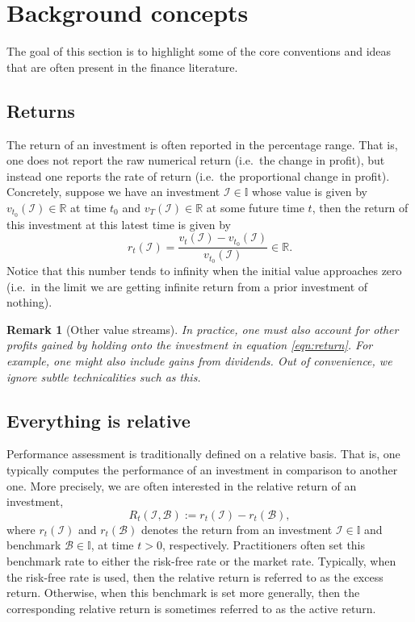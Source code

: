 \documentclass[12pt]{article}
\newtheorem{remark}{Remark}[section]
\begin{document}
\section{Background concepts}
The goal of this section is to highlight some of the core conventions and ideas that are often present in the finance literature.
\subsection{Returns}
The return of an investment is often reported in the percentage range. That is, one does not report the raw numerical return (i.e.\ the change in profit), but instead one reports the rate of return (i.e.\ the proportional change in profit). Concretely, suppose we have an investment $\mathcal{I} \in \mathbb{I}$ whose value is given by $v_{t_0}(\mathcal{I}) \in \mathbb{R}$ at time $t_0$ and $v_T(\mathcal{I}) \in \mathbb{R}$ at some future time $t$, then the return of this investment at this latest time is given by
\begin{equation}
    r_t(\mathcal{I}) = \frac{v_t(\mathcal{I}) - v_{t_0}(\mathcal{I})}{v_{t_0}(\mathcal{I})} \in \mathbb{R}.
    \label{eqn:return}
\end{equation}
Notice that this number tends to infinity when the initial value approaches zero (i.e.\ in the limit we are getting infinite return from a prior investment of nothing).

\begin{remark}
	[Other value streams] In practice, one must also account for other profits gained by holding onto the investment in equation \eqref{eqn:return}. For example, one might also include gains from dividends. Out of convenience, we ignore subtle technicalities such as this.
\end{remark}

\subsection{Everything is relative}
Performance assessment is traditionally defined on a relative basis. That is, one typically computes the performance of an investment in comparison to another one. More precisely, we are often interested in the relative return of an investment,
\begin{equation}
    R_t(\mathcal{I}, \mathcal{B}) := r_t(\mathcal{I}) - r_t(\mathcal{B}),
    \label{eqn:relative_return}
\end{equation}
where $r_t(\mathcal{I})$ and $r_t(\mathcal{B})$ denotes the return from an investment $\mathcal{I} \in \mathbb{I}$ and benchmark $\mathcal{B} \in \mathbb{I}$, at time $t > 0$, respectively. Practitioners often set this benchmark rate to either the risk-free rate or the market rate. Typically, when the risk-free rate is used, then the relative return is referred to as the excess return. Otherwise, when this benchmark is set more generally, then the corresponding relative return is sometimes referred to as the active return.
\end{document}

